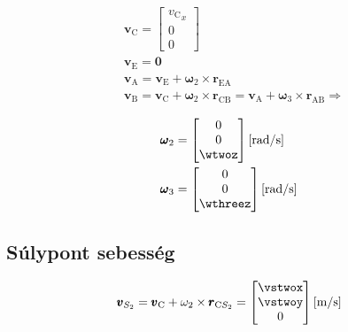 \begin{align}
	&\pmb{v}_\text{C} = 
	\begin{bmatrix}
		{v_\text{C}}_x \\ 0 \\ 0
	\end{bmatrix} \\
	&\pmb{v}_\text{E} = \pmb{0} \\
	&\pmb{v}_\text{A} = \pmb{v}_\text{E} + \pmb{\omega}_2 \times \pmb{r}_\text{EA} \\
	&\pmb{v}_\text{B} = 
	\pmb{v}_\text{C} + \pmb{\omega}_2 \times \pmb{r}_\text{CB} = 
	\pmb{v}_\text{A} + \pmb{\omega}_3 \times \pmb{r}_\text{AB} \Rightarrow \\
\end{align}
\begin{align}
	&\pmb{\omega}_2 = 
	\begin{bmatrix}
		0 \\ 0 \\ \wtwoz
	\end{bmatrix} \siunit{}{\radian\per\second} \\
	&\pmb{\omega}_3 = 
	\begin{bmatrix}
		0 \\ 0 \\ \wthreez
	\end{bmatrix} \siunit{}{\radian\per\second}
\end{align}

\subsection{Súlypont sebesség}
\begin{equation}
	\pmb{v}_{S_2} = \pmb{v}_\text{C} + \omega_2 \times \pmb{r}_{\text{C}{S_2}} = 
	\begin{bmatrix}
		\vstwox \\ \vstwoy \\ 0
	\end{bmatrix} \siunit{}{\m\per\second}
\end{equation}
